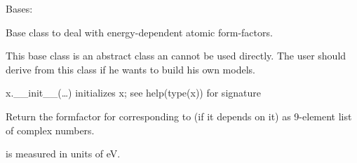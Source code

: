 \documentclass[letterpaper,10pt,english]{sphinxmanual}
\begin{document}
\begin{fulllineitems}
\label{\detokenize{modules-api/samplerepresentation:SampleRepresentation.Formfactor}}
Bases: 

Base class to deal with energy-dependent atomic form-factors.

This base class is an abstract class an cannot be used directly.
The user should derive from this class if he wants to build his own models.

\begin{fulllineitems}
\label{\detokenize{modules-api/samplerepresentation:SampleRepresentation.Formfactor.__init__}}
x.\_\_init\_\_(…) initializes x; see help(type(x)) for signature

\end{fulllineitems}


\begin{fulllineitems}
\label{\detokenize{modules-api/samplerepresentation:SampleRepresentation.Formfactor.getFF}}
Return the formfactor for  corresponding to  (if it depends on it) as 9-element list of complex numbers.

 is measured in units of eV.

\end{fulllineitems}


\end{fulllineitems}

\end{document}
